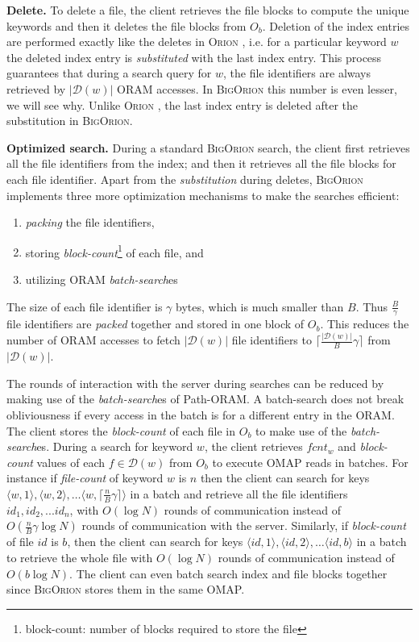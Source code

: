 \documentclass[sigconf]{acmart}
\newcommand{\pair}[2]{{\langle \ensuremath{#1, #2} \rangle}}
\newcommand{\DB}[1]{\mathcal{D}(#1)}
\newcommand{\vol}[1]{\lvert{#1}\rvert}
\newcommand{\ceil}[1]{\lceil #1 \rceil}
\newcommand{\Orion}{\textsc{Orion }}
\newcommand{\BigOrion}{\textsc{BigOrion }}
\newcommand{\Bigorion}{\textsc{BigOrion}}
\begin{document}
\noindent\textbf{Delete.} To delete a file, the client retrieves the file blocks to compute the unique keywords and then it deletes the file blocks from $O_b$.
%
Deletion of the index entries are performed exactly like the deletes in \Orion \cite{Mitra}, i.e. for a particular keyword $w$ the deleted index entry is \emph{substituted} with the last index entry. 
%
This process guarantees that during a search query for $w$, the file identifiers are always retrieved by $\vol{\DB{w}}$ ORAM accesses.
%
In \BigOrion this number is even lesser, we will see why. 
%
Unlike \Orion, the last index entry is deleted after the substitution in \Bigorion.







\noindent\textbf{Optimized search.} During a standard \BigOrion search, the client first retrieves all the file identifiers from the index; and then it retrieves all the file blocks for each file identifier. Apart from the \emph{substitution} during deletes, \BigOrion implements three more optimization mechanisms to make the searches efficient: 
\begin{enumerate}
    \item  \emph{packing} the file identifiers,
    \item storing \emph{block-count}\footnote{block-count: number of blocks required to store the file} of each file, and
    \item utilizing ORAM \emph{batch-search}es
\end{enumerate}


The size of each file identifier is $\gamma$ bytes, which is much smaller than $B$. Thus $\frac{B}{\gamma}$ file identifiers are \emph{packed} together and stored in one block of $O_b$. This reduces the number of ORAM accesses to fetch $\vol{\DB{w}}$ file identifiers to $\ceil{\frac{\vol{\DB{w}}}{B}\gamma}$ from $\vol{\DB{w}}$.

The rounds of interaction with the server during searches can be reduced by making use of the \emph{batch-search}es of Path-ORAM. A batch-search does not break obliviousness if every access in the batch is for a different entry in the ORAM. The client stores the \emph{block-count} of each file in $O_b$ to make use of the \emph{batch-search}es. During a search for keyword $w$, the client retrieves  $fcnt_w$ and \emph{block-count} values of each $f\in \DB{w}$ from $O_b$ to execute OMAP reads in batches. For instance if 
\emph{file-count} of keyword $w$ is $n$ then the client can search for keys $\pair{w}{1},\pair{w}{2},\ldots \pair{w}{\ceil{\frac{n}{B}\gamma}}$ in a batch and retrieve all the file identifiers $id_1,id_2,...id_n$, with $O(\log N)$ rounds of communication instead of $O(\frac{n}{B}\gamma\log N)$ rounds of communication with the server. Similarly, if \emph{block-count} of file $id$ is $b$, then the client can search for keys $\pair{id}{1},\pair{id}{2},\ldots \pair{id}{b}$ in a batch to retrieve the whole file with $O(\log N)$ rounds of communication instead of $O(b\log N)$. The client can even batch search index and file blocks together since \BigOrion stores them in the same OMAP. 
\end{document}
